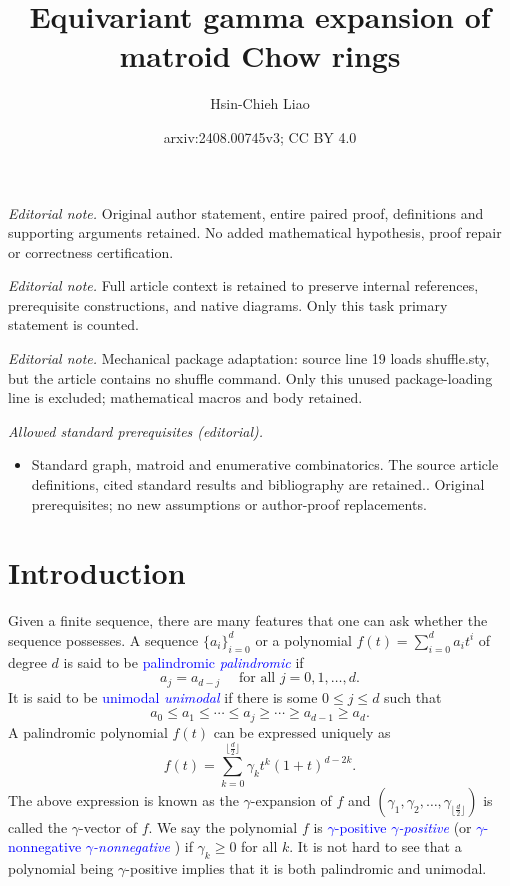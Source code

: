 \documentclass[reqno]{amsart}
\title{Equivariant gamma expansion of matroid Chow rings}
\author{Hsin-Chieh Liao}
\date{arxiv:2408.00745v3; CC BY 4.0}
\newcommand{\defin}[1]{%
\relax\ifmmode%
\textcolor{blue}{#1}%
\else\textcolor{blue}{\emph{#1}}%
\fi%
}
\theoremstyle{definition}
\theoremstyle{remark}
\begin{document}
\maketitle
\noindent\textit{Editorial note.} Original author statement, entire paired proof, definitions and supporting arguments retained. No added mathematical hypothesis, proof repair or correctness certification.\par\medskip
\noindent\textit{Editorial note.} Full article context is retained to preserve internal references, prerequisite constructions, and native diagrams. Only this task primary statement is counted.\par\medskip
\noindent\textit{Editorial note.} Mechanical package adaptation: source line 19 loads shuffle.sty, but the article contains no shuffle command. Only this unused package-loading line is excluded; mathematical macros and body retained.\par\medskip
\noindent\textit{Allowed standard prerequisites (editorial).}\begin{itemize}
\item Standard graph, matroid and enumerative combinatorics. The source article definitions, cited standard results and bibliography are retained.. Original prerequisites; no new assumptions or author-proof replacements.
\end{itemize}\medskip
\section{Introduction}
Given a finite sequence, there are many features that one can ask whether the sequence possesses. A sequence $\{a_i\}_{i=0}^d$ or a polynomial $f(t)=\sum_{i=0}^d a_i t^i$ of degree $d$ is said to be \defin{palindromic} if 
\[
    a_j=a_{d-j}\quad \text{ for all } j=0,1,\ldots, d.
\]
It is said to be \defin{unimodal} if there is some $0\le j\le d$ such that 
\[
    a_0\le a_1\le\cdots\le a_j\ge\cdots\ge a_{d-1}\ge a_d.
\]
A palindromic polynomial $f(t)$ can be expressed uniquely as 
\[
    f(t)=\sum_{k=0}^{\lfloor\frac{d}{2}\rfloor}\gamma_{k}t^k(1+t)^{d-2k}.
\]
The above expression is known as the $\gamma$-expansion of $f$ and $(\gamma_1,\gamma_2,\ldots, \gamma_{\lfloor\frac{d}{2}\rfloor})$ is called the $\gamma$-vector of $f$.
We say the polynomial $f$ is \defin{$\gamma$-positive} (or \defin{$\gamma$-nonnegative}) if $\gamma_k\ge 0$ for all $k$. 
It is not hard to see that a polynomial being $\gamma$-positive implies that it is both palindromic and unimodal. 
\end{document}
